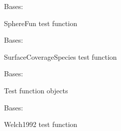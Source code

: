 \documentclass[letterpaper,10pt,english,openany,oneside]{sphinxmanual}
\begin{document}

\begin{fulllineitems}
\label{\detokenize{pygpc:pygpc.Test.SphereFun}}
Bases: {\hyperref[\detokenize{pygpc:pygpc.Test.Test}]{}}

SphereFun test function

\end{fulllineitems}


\begin{fulllineitems}
\label{\detokenize{pygpc:pygpc.Test.SurfaceCoverageSpecies}}
Bases: {\hyperref[\detokenize{pygpc:pygpc.Test.Test}]{}}

SurfaceCoverageSpecies test function

\end{fulllineitems}


\begin{fulllineitems}
\label{\detokenize{pygpc:pygpc.Test.Test}}
Bases: 

Test function objects

\end{fulllineitems}


\begin{fulllineitems}
\label{\detokenize{pygpc:pygpc.Test.Welch1992}}
Bases: {\hyperref[\detokenize{pygpc:pygpc.Test.Test}]{}}

Welch1992 test function

\end{fulllineitems}
\end{document}
